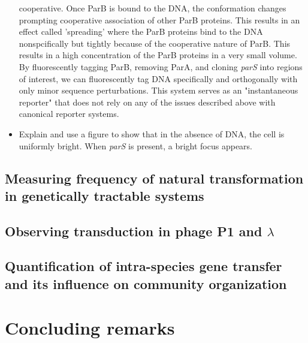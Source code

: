 \begin{itemize}
		cooperative. Once ParB is bound to the DNA, the conformation
		changes prompting cooperative association of other ParB
		proteins. This results in an effect called 'spreading' where the
		ParB proteins bind to the DNA nonspcifically but tightly because
		of the cooperative nature of ParB. This results in a high
		concentration of the ParB proteins in a very small volume. By
		fluorescently tagging ParB, removing ParA, and cloning
		\textit{parS} into regions of interest, we can fluorescently tag
		DNA specifically and orthogonally with only minor sequence
		perturbations. This system serves as an "instantaneous
		reporter" that does not rely on any of the issues described
		above with canonical reporter systems.
	\item Explain and use a figure to show that in the absence of DNA, the
		cell is uniformly bright. When \textit{parS} is present, a
		bright focus appears. 
\end{itemize}
\subsection*{Measuring frequency of natural transformation in genetically
tractable systems}
\subsection*{Observing transduction in phage P1 and $\lambda$}
\subsection*{Quantification of intra-species gene transfer and its influence on
community organization}


\section*{Concluding remarks}


